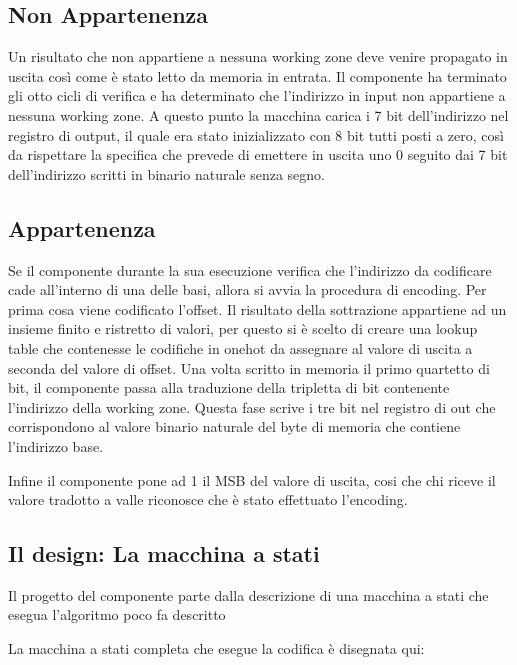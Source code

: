 \documentclass{article}
\begin{document}
\subsection{Non Appartenenza}

Un risultato che non appartiene a nessuna working zone deve venire propagato in uscita così come è stato letto da memoria in entrata. Il componente ha terminato gli otto cicli di verifica e ha determinato che l'indirizzo in input non appartiene a nessuna working zone. A questo punto la macchina carica i 7 bit dell'indirizzo nel registro di output, il quale era stato inizializzato con 8 bit tutti posti a zero, così da rispettare la specifica che prevede di emettere in uscita uno 0 seguito dai 7 bit dell'indirizzo scritti in binario naturale senza segno.

\subsection{Appartenenza}

Se il componente durante la sua esecuzione verifica che l'indirizzo da codificare cade all'interno di una delle basi, allora si avvia la procedura di encoding. Per prima cosa viene codificato l'offset. Il risultato della sottrazione appartiene ad un insieme finito e ristretto di valori, per questo si è scelto di creare una lookup table che contenesse le codifiche in onehot da assegnare al valore di uscita a seconda del valore di offset.
Una volta scritto in memoria il primo quartetto di bit, il componente passa alla traduzione della tripletta di bit contenente l'indirizzo della working zone. Questa fase scrive i tre bit nel registro di out che corrispondono al valore binario naturale del byte di memoria che contiene l'indirizzo base.

Infine il componente pone ad 1 il MSB del valore di uscita, cosi che chi riceve il valore tradotto a valle riconosce che è stato effettuato l'encoding.

\subsection{Il design: La macchina a stati}

Il progetto del componente parte dalla descrizione di una macchina a stati che esegua l'algoritmo poco fa descritto

La macchina a stati completa che esegue la codifica è disegnata qui:

\end{document}
